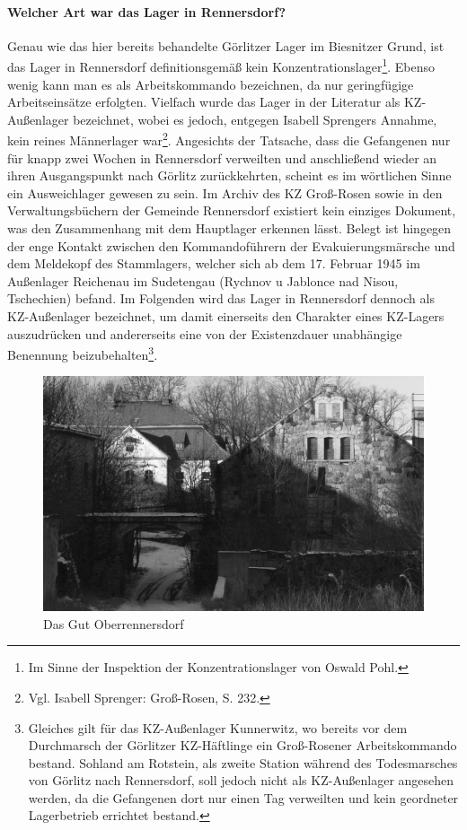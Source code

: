 \paragraph{Welcher Art war das Lager in Rennersdorf?} Genau wie das hier bereits behandelte Görlitzer Lager im Biesnitzer Grund, ist das Lager in Rennersdorf definitionsgemäß kein Konzentrationslager\footnote{Im Sinne der Inspektion der Konzentrationslager von Oswald Pohl.}. Ebenso wenig kann man es als Arbeitskommando bezeichnen, da nur geringfügige Arbeitseinsätze erfolgten. 
Vielfach wurde das Lager in der Literatur als KZ-Außenlager bezeichnet, wobei es jedoch, entgegen Isabell Sprengers Annahme, kein reines Männerlager war\footnote{Vgl. Isabell Sprenger: Groß-Rosen, S. 232.}. Angesichts der Tatsache, dass die Gefangenen nur für knapp zwei Wochen in Rennersdorf verweilten und anschließend wieder an ihren Ausgangspunkt nach Görlitz zurückkehrten, scheint es im wörtlichen Sinne ein Ausweichlager gewesen zu sein. Im Archiv des KZ Groß-Rosen sowie in den Verwaltungsbüchern der Gemeinde Rennersdorf existiert kein einziges Dokument, was den Zusammenhang mit dem Hauptlager erkennen lässt. Belegt ist hingegen der enge Kontakt zwischen den Kommandoführern der Evakuierungsmärsche und dem Meldekopf des Stammlagers, welcher sich ab dem 17. Februar 1945 im Außenlager Reichenau im Sudetengau (Rychnov u Jablonce nad Nisou, Tschechien) befand. 
Im Folgenden wird das Lager in Rennersdorf dennoch als KZ-Außenlager bezeichnet, um damit einerseits den Charakter eines KZ-Lagers auszudrücken und andererseits eine von der Existenzdauer unabhängige Benennung beizubehalten\footnote{Gleiches gilt für das KZ-Außenlager Kunnerwitz, wo bereits vor dem Durchmarsch der Görlitzer KZ-Häftlinge ein Groß-Rosener Arbeitskommando bestand. Sohland am Rotstein, als zweite Station während des Todesmarsches von Görlitz nach Rennersdorf, soll jedoch nicht als KZ-Außenlager angesehen werden, da die Gefangenen dort nur einen Tag verweilten und kein geordneter Lagerbetrieb errichtet bestand.}. 



\begin{figure}[htb]
    \includegraphics[width=\linewidth]{images/renn01}
    \caption[Gut Oberennersdorf]{Das Gut Oberrennersdorf}
    \label{gutoberrennersdorf}
\end{figure}



